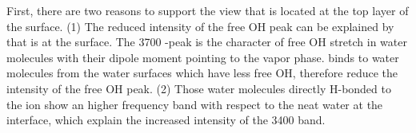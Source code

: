 %
%
%
%

First, there are two reasons to support the view that \nitrate is located at the top layer of the surface.
(1) The reduced intensity of the free OH peak can be explained by that \nitrate is at the surface.
The 3700 \centimeter-peak is the character of free OH stretch in water molecules with 
their dipole moment pointing to the vapor phase. \cite{Du93,Baldelli1997} 
\nitrate binds to water molecules from the water surfaces which have less free OH, therefore reduce the intensity of the free OH peak.
(2) Those water molecules directly H-bonded to the \nitrate ion show an higher frequency band with respect to the neat 
water at the interface, which explain the increased intensity of the 3400 \cm band.

